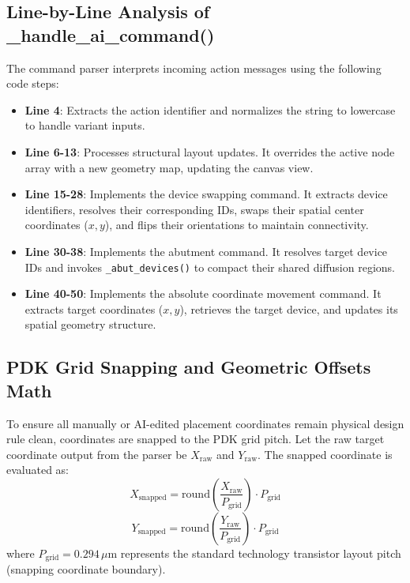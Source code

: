 \subsection{Line-by-Line Analysis of \_handle\_ai\_command()}
The command parser interprets incoming action messages using the following code steps:
\begin{itemize}
    \item \textbf{Line 4}: Extracts the action identifier and normalizes the string to lowercase to handle variant inputs.
    \item \textbf{Line 6-13}: Processes structural layout updates. It overrides the active node array with a new geometry map, updating the canvas view.
    \item \textbf{Line 15-28}: Implements the device swapping command. It extracts device identifiers, resolves their corresponding IDs, swaps their spatial center coordinates ($x, y$), and flips their orientations to maintain connectivity.
    \item \textbf{Line 30-38}: Implements the abutment command. It resolves target device IDs and invokes \texttt{\_abut\_devices()} to compact their shared diffusion regions.
    \item \textbf{Line 40-50}: Implements the absolute coordinate movement command. It extracts target coordinates ($x, y$), retrieves the target device, and updates its spatial geometry structure.
\end{itemize}

\subsection{PDK Grid Snapping and Geometric Offsets Math}
To ensure all manually or AI-edited placement coordinates remain physical design rule clean, coordinates are snapped to the PDK grid pitch. Let the raw target coordinate output from the parser be $X_{\text{raw}}$ and $Y_{\text{raw}}$. The snapped coordinate is evaluated as:
\begin{equation}
    X_{\text{snapped}} = \text{round}\left( \frac{X_{\text{raw}}}{P_{\text{grid}}} \right) \cdot P_{\text{grid}}
\end{equation}
\begin{equation}
    Y_{\text{snapped}} = \text{round}\left( \frac{Y_{\text{raw}}}{P_{\text{grid}}} \right) \cdot P_{\text{grid}}
\end{equation}
where $P_{\text{grid}} = 0.294\,\mu\text{m}$ represents the standard technology transistor layout pitch (snapping coordinate boundary).

